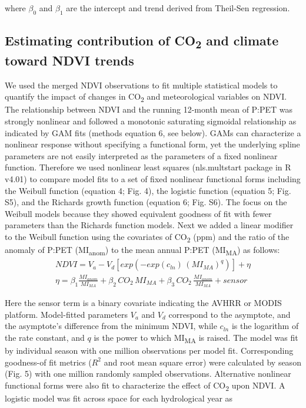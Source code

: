 \documentclass[gc, manuscript]{copernicus}
\begin{document}
where \(\beta_0\) and \(\beta_1\) are the intercept and trend derived
from Theil-Sen regression.

\subsection{\texorpdfstring{Estimating contribution of
CO\textsubscript{2} and climate toward NDVI
trends}{Estimating contribution of CO2 and climate toward NDVI trends}}

We used the merged NDVI observations to fit multiple statistical models
to quantify the impact of changes in CO\textsubscript{2} and
meteorological variables on NDVI. The relationship between NDVI and the
running 12-month mean of P:PET was strongly nonlinear and followed a
monotonic saturating sigmoidal relationship as indicated by GAM fits
(methods equation 6, see below). GAMs can characterize a nonlinear
response without specifying a functional form, yet the underlying spline
parameters are not easily interpreted as the parameters of a fixed
nonlinear function. Therefore we used nonlinear least squares
(nls.multstart package \citep{padfield_matheson20} in R v4.01) to
compare model fits to a set of fixed nonlinear functional forms
including the Weibull function (equation 4; Fig. 4), the logistic
function (equation 5; Fig. S5), and the Richards growth function
(equation 6; Fig. S6). The focus on the Weibull models because they
showed equivalent goodness of fit with fewer parameters than the
Richards function models. Next we added a linear modifier to the Weibull
function using the covariates of CO\textsubscript{2} (ppm) and the ratio
of the anomaly of P:PET (MI\textsubscript{anom}) to the mean annual
P:PET (MI\textsubscript{MA}) as follows: \begin{align}
NDVI=V_a-V_d[exp(-exp(c_{ln})\,(MI_{MA})^{q})]+\eta\\
\eta = \beta_{1}\frac{MI_{anom}}{MI_{MA}}+\beta_{2}\,CO_2\,MI_{MA} +\beta_{3}\,CO_2\,\frac{MI_{anom}}{MI_{MA}}+sensor\nonumber
\end{align}

Here the sensor term is a binary covariate indicating the AVHRR or MODIS
platform. Model-fitted parameters \(V_a\) and \(V_d\) correspond to the
asymptote, and the asymptote's difference from the minimum NDVI, while
\(c_{ln}\) is the logarithm of the rate constant, and \(q\) is the power
to which MI\textsubscript{MA} is raised. The model was fit by individual
season with one million observations per model fit. Corresponding
goodness-of fit metrics (\(R^2\) and root mean square error) were
calculated by season (Fig. 5) with one million randomly sampled
observations. Alternative nonlinear functional forms were also fit to
characterize the effect of CO\textsubscript{2} upon NDVI. A logistic
model was fit across space for each hydrological year as
\end{document}
